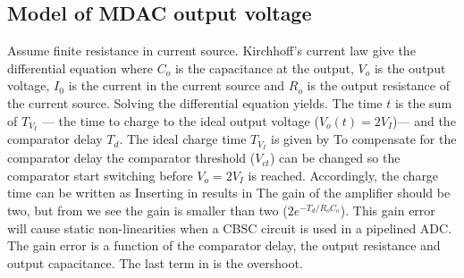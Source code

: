 

\subsection{Model of MDAC output voltage }

Assume finite resistance in current source. Kirchhoff's current law give the
differential equation
where $C_o$ is the capacitance at the output, $V_o$ is the
 output voltage, $I_0$ is the current in the current source and
$R_o$ is the output resistance of the current source. Solving the
differential equation yields.
The time $t$ is the sum of $T_{V_I}$ --- the time to charge to the ideal
output voltage ($V_o(t) = 2V_I$)--- and the comparator delay
$T_d$. The ideal charge time $T_{V_I}$ is given by
To compensate for the comparator delay the comparator threshold
($V_{ct}$) can be changed so
the comparator start switching before $V_o = 2V_I$ is reached. Accordingly,
the charge time can be written as
Inserting  in  results in
The gain of the amplifier should be two, but from  we
see the gain is smaller than two ($2e^{-T_d/R_oC_o}$). This gain error will cause
static non-linearities when a CBSC circuit is used in a pipelined
ADC. The gain error is a function of the comparator delay, the output
resistance and output capacitance. The last term in  is the overshoot. 




